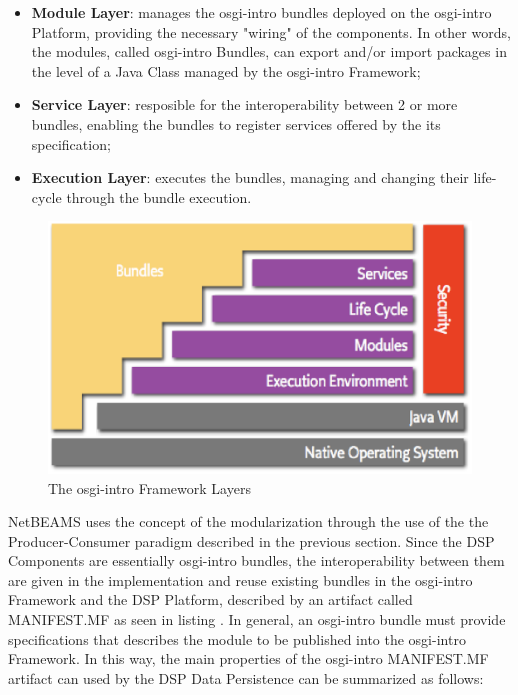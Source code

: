 \begin{itemize}
  \item \textbf{Module Layer}: manages the osgi-intro bundles deployed on the osgi-intro
  Platform, providing the necessary "wiring" of the components. In other words,
  the modules, called osgi-intro Bundles, can export and/or import packages in the
  level of a Java Class managed by the osgi-intro Framework;
  \item \textbf{Service Layer}: resposible for the interoperability between 2
  or more bundles, enabling the bundles to register services offered by
  the its specification;
  \item \textbf{Execution Layer}: executes the bundles, managing and changing
  their life-cycle through the bundle execution.
\end{itemize}

\begin{figure}[!h]
  \centering
  \includegraphics[scale=0.5]{../diagrams/layering-osgi}
  \caption{The osgi-intro Framework Layers}
  \label{fig:layering-osgi-intro}
\end{figure}

NetBEAMS uses the concept of the modularization through the use of the the
Producer-Consumer paradigm described in the previous section. Since the DSP
Components are essentially osgi-intro bundles, the interoperability between them are
given in the implementation and reuse existing bundles in the osgi-intro Framework
and the DSP Platform, described by an artifact called MANIFEST.MF as seen in
listing \cite{file:osgi-intro-manifest}. In general, an osgi-intro bundle must
provide specifications that describes the module to be published into the osgi-intro
Framework. In this way, the main properties of the osgi-intro MANIFEST.MF artifact can
used by the DSP Data Persistence can be summarized as follows:

